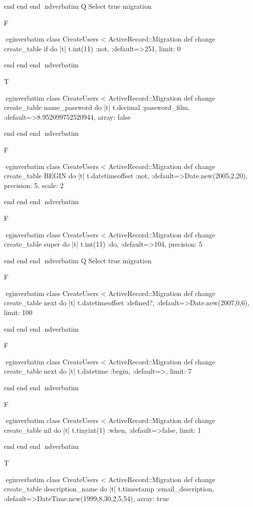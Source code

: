     end 
  end 
end
nd{verbatim}
Q
 Select true migration

F

egin{verbatim}
 class CreateUsers < ActiveRecord::Migration 
  def change 
    create_table if do |t| 
      t.int(11) :not, :default=>251, limit: 0
    
    end 
  end 
end
nd{verbatim}

T

egin{verbatim}
 class CreateUsers < ActiveRecord::Migration 
  def change 
    create_table name_password do |t| 
      t.decimal :password_film, :default=>8.952099752520944, array: false
    
    end 
  end 
end
nd{verbatim}

F

egin{verbatim}
 class CreateUsers < ActiveRecord::Migration 
  def change 
    create_table BEGIN do |t| 
      t.datetimeoffset :not, :default=>Date.new(2005,2,20), precision: 5, scale: 2
    
    end 
  end 
end
nd{verbatim}

F

egin{verbatim}
 class CreateUsers < ActiveRecord::Migration 
  def change 
    create_table super do |t| 
      t.int(11) :do, :default=>104, precision: 5
    
    end 
  end 
end
nd{verbatim}
Q
 Select true migration

F

egin{verbatim}
 class CreateUsers < ActiveRecord::Migration 
  def change 
    create_table next do |t| 
      t.datetimeoffset :defined?, :default=>Date.new(2007,0,6), limit: 100
    
    end 
  end 
end
nd{verbatim}

F

egin{verbatim}
 class CreateUsers < ActiveRecord::Migration 
  def change 
    create_table next do |t| 
      t.datetime :begin, :default=>, limit: 7
    
    end 
  end 
end
nd{verbatim}

F

egin{verbatim}
 class CreateUsers < ActiveRecord::Migration 
  def change 
    create_table nil do |t| 
      t.tinyint(1) :when, :default=>false, limit: 1
    
    end 
  end 
end
nd{verbatim}

T

egin{verbatim}
 class CreateUsers < ActiveRecord::Migration 
  def change 
    create_table description_name do |t| 
      t.timestamp :email_description, :default=>DateTime.new(1999,8,30,2,5,54), array: true
    

